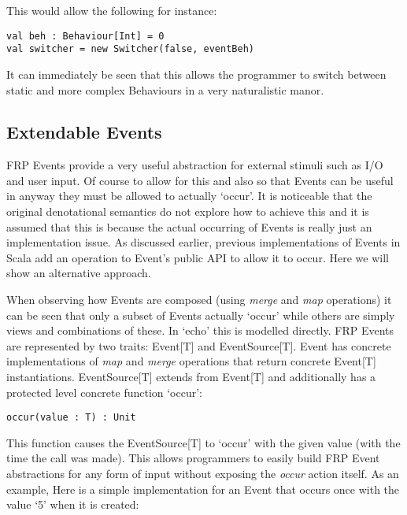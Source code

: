       This would allow the following for instance:

\begin{verbatim}
val beh : Behaviour[Int] = 0
val switcher = new Switcher(false, eventBeh)
\end{verbatim}       

      It can immediately be seen that this allows the programmer to switch between static and more complex
      Behaviours in a very naturalistic manor.
      
    \subsection{Extendable Events}
      FRP Events provide a very useful abstraction for external stimuli such as I/O and user input. Of course
      to allow for this and also so that Events can be useful in anyway they must be allowed to actually `occur'.
      It is noticeable that the original denotational semantics \cite{Elliott1997} do not explore how to achieve
      this and it is assumed that this is because the actual occurring of Events is really just an implementation
      issue. As discussed earlier, previous implementations of Events in Scala add an operation to Event's
      public API to allow it to occur. Here we will show an alternative approach.
      
      When observing how Events are composed (using \emph{merge} and \emph{map} operations) it can be seen that
      only a subset of Events actually `occur' while others are simply views and combinations of these.
      In `echo' this is modelled directly. FRP Events are represented by two traits: Event[T] and EventSource[T].
      Event has concrete implementations of \emph{map} and \emph{merge} operations that
      return concrete Event[T] instantiations. EventSource[T] extends
      from Event[T] and additionally has a protected level concrete function `occur':
      
\begin{verbatim}
occur(value : T) : Unit
\end{verbatim}  

      This function causes the EventSource[T] to `occur' with the given value (with the time the call was made). This allows 
      programmers
      to easily build FRP Event abstractions for any form of input without exposing the \emph{occur} action itself.
      As an example, Here is a simple implementation for an Event that occurs once with the value `5' when it 
      is created:
      
